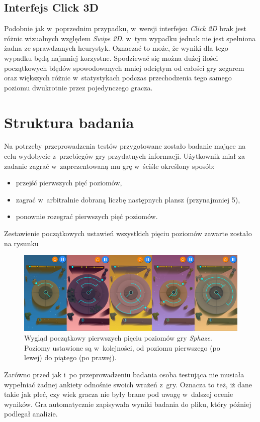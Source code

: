 \documentclass[a4paper,12pt,numbers=noenddot]{report}
\begin{document}
\subsection{Interfejs Click 3D}
Podobnie jak w~poprzednim przypadku, w~wersji interfejsu \textit{Click 2D} brak jest różnic wizualnych względem \textit{Swipe 2D}. w~tym wypadku jednak nie jest spełniona żadna ze sprawdzanych heurystyk. Oznaczać to może, że wyniki dla tego wypadku będą najmniej korzystne. Spodziewać się można dużej ilości początkowych błędów spowodowanych mniej odciętym od całości gry zegarem oraz większych różnic w~statystykach podczas przechodzenia tego samego poziomu dwukrotnie przez pojedynczego gracza.
\section{Struktura badania}
Na potrzeby przeprowadzenia testów przygotowane zostało badanie mające na celu wydobycie z~przebiegów gry przydatnych informacji. 
Użytkownik miał za zadanie zagrać w~zaprezentowaną mu grę w~ściśle określony sposób:
\begin{itemize}
\item przejść pierwszych pięć poziomów,
\item zagrać w~arbitralnie dobraną liczbę następnych plansz (przynajmniej 5),
\item ponownie rozegrać pierwszych pięć poziomów.
\end{itemize}

Zestawienie początkowych ustawień wszystkich pięciu poziomów zawarte zostało na rysunku 
\begin{figure}[h!]
	\centering
  	\includegraphics[width=\linewidth]{fig/all_levels.jpg}
	\caption{Wygląd początkowy pierwszych pięciu poziomów gry \textit{Sphaze}. Poziomy ustawione są w~kolejności, od poziomu pierwszego (po lewej) do piątego (po prawej).}
	\label{fig:all_levels}
\end{figure}
Zarówno przed jak i~po przeprowadzeniu badania osoba testująca nie musiała wypełniać żadnej ankiety odnośnie swoich wrażeń z~gry. Oznacza to też, iż dane takie jak płeć, czy wiek gracza nie były brane pod uwagę w~dalszej ocenie wyników. Gra automatycznie zapisywała wyniki badania do pliku, który później podlegał analizie.
\end{document}
